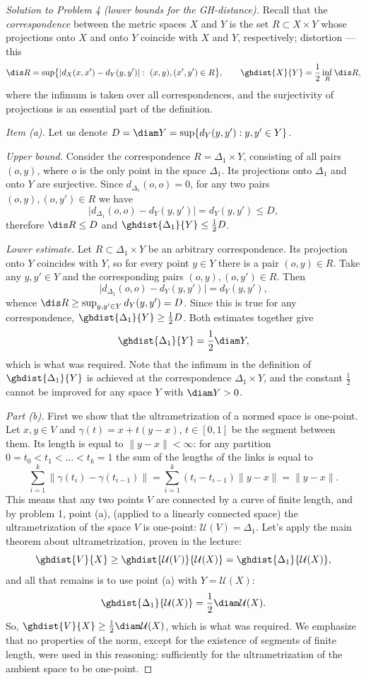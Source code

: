\documentclass[a4paper,12pt]{report}
\begin{document}
\begin{proof}[Solution to Problem \textup{4} \textup{(}lower bounds for the GH-distance\textup{)}]
Recall that the \emph{correspondence} between the metric spaces $X$ and $Y$ is the set $R\subset X\times Y$ whose projections onto $X$ and onto $Y$ coincide with $X$ and $Y$, respectively\textup{;} distortion --- this
\[
\dis R=\sup\bigl\{|d_X(x,x')-d_Y(y,y')|:\ (x,y),(x',y')\in R\bigr\},\qquad
\ghdist{X}{Y}=\frac12\inf_R\dis R ,
\]
where the infimum is taken over all correspondences, and the surjectivity of projections is an essential part of the definition.

\textit{Item \textup{(a)}.} Let us denote $D=\diam Y=\sup\{d_Y(y,y'):y,y'\in Y\}$.

\textit{Upper bound.} Consider the correspondence $R=\Delta_1\times Y$, consisting of all pairs $(o,y)$, where $o$ is the only point in the space $\Delta_1$. Its projections onto $\Delta_1$ and onto $Y$ are surjective. Since $d_{\Delta_1}(o,o)=0$, for any two pairs $(o,y),(o,y')\in R$ we have
\[
\bigl|d_{\Delta_1}(o,o)-d_Y(y,y')\bigr|=d_Y(y,y')\le D ,
\]
therefore $\dis R\le D$ and $\ghdist{\Delta_1}{Y}\le\frac12D$.

\textit{Lower estimate.} Let $R\subset\Delta_1\times Y$ be an arbitrary correspondence. Its projection onto $Y$ coincides with $Y$, so for every point $y\in Y$ there is a pair $(o,y)\in R$. Take any $y,y'\in Y$ and the corresponding pairs $(o,y),(o,y')\in R$. Then
\[
\bigl|d_{\Delta_1}(o,o)-d_Y(y,y')\bigr|=d_Y(y,y') ,
\]
whence $\dis R\ge\sup_{y,y'\in Y}d_Y(y,y')=D$. Since this is true for any correspondence, $\ghdist{\Delta_1}{Y}\ge\frac12D$. Both estimates together give
\[
\ghdist{\Delta_1}{Y}=\frac12\diam Y ,
\]
which is what was required. Note that the infimum in the definition of $\ghdist{\Delta_1}{Y}$ is achieved at the correspondence $\Delta_1\times Y$, and the constant $\frac12$ cannot be improved for any space $Y$ with $\diam Y>0$.

\textit{Part \textup{(b)}.} First we show that the ultrametrization of a normed space is one-point. Let $x,y\in V$ and $\gamma(t)=x+t(y-x)$, $t\in[0,1]$ be the segment between them. Its length is equal to $\|y-x\|<\infty$\textup{:} for any partition $0=t_0<t_1<\dots<t_k=1$ the sum of the lengths of the links is equal to
\[
\sum_{i=1}^k\bigl\|\gamma(t_i)-\gamma(t_{i-1})\bigr\|=\sum_{i=1}^k(t_i-t_{i-1})\|y-x\|=\|y-x\| .
\]
This means that any two points $V$ are connected by a curve of finite length, and by problem \textup{1}, point \textup{(a)}, \textup{(}applied to a linearly connected space\textup{)} the ultrametrization of the space $V$ is one-point\textup{:} $\mathcal U(V)=\Delta_1$. Let's apply the main theorem about ultrametrization, proven in the lecture\textup{:}
\[
\ghdist{V}{X}\ge\ghdist{\mathcal U(V)}{\mathcal U(X)}=\ghdist{\Delta_1}{\mathcal U(X)} ,
\]
and all that remains is to use point \textup{(a)} with $Y=\mathcal U(X)$\textup{:}
\[
\ghdist{\Delta_1}{\mathcal U(X)}=\frac12\diam\mathcal U(X) .
\]
So, $\ghdist{V}{X}\ge\frac12\diam\mathcal U(X)$, which is what was required. We emphasize that no properties of the norm, except for the existence of segments of finite length, were used in this reasoning\textup{:} sufficiently for the ultrametrization of the ambient space to be one-point.


\end{proof}
\end{document}
